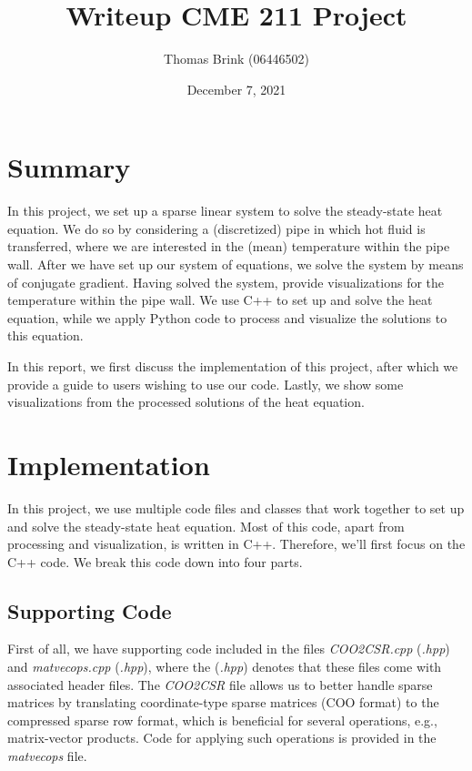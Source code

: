 \documentclass[12pt, a4paper]{article}
\title{\textbf{Writeup CME 211 Project}}
\author{Thomas Brink (06446502)}
\date{December 7, 2021}
\begin{document}
\maketitle

\section{Summary}
In this project, we set up a sparse linear system to solve the steady-state heat
equation. We do so by considering a (discretized) pipe in which hot fluid is 
transferred, where we are interested in the (mean) temperature within the pipe 
wall. After we have set up our system of equations, we solve the system by means
of conjugate gradient. Having solved the system, provide visualizations for the
temperature within the pipe wall. We use C++ to set up and solve the heat 
equation, while we apply Python code to process and visualize the solutions to 
this equation.

In this report, we first discuss the implementation of this project, after which
we provide a guide to users wishing to use our code. Lastly, we show some 
visualizations from the processed solutions of the heat equation. 

\section{Implementation}
In this project, we use multiple code files and classes that work together to 
set up and solve the steady-state heat equation. Most of this code, apart from
processing and visualization, is written in C++. Therefore, we'll first focus 
on the C++ code. We break this code down into four parts.

\subsection{Supporting Code}
First of all, we have supporting code included in the files 
\textit{COO2CSR.cpp} (\textit{.hpp}) and \textit{matvecops.cpp} 
(\textit{.hpp}), where the (\textit{.hpp}) denotes that these files come with 
associated header files. The \textit{COO2CSR} file allows us to better handle 
sparse matrices by translating coordinate-type sparse matrices (COO format) to 
the compressed sparse row format, which is beneficial for several operations, 
e.g., matrix-vector products. Code for applying such operations is provided in
the \textit{matvecops} file. 
\end{document}
